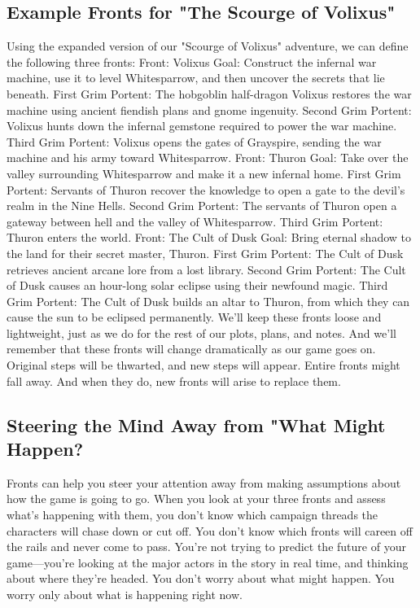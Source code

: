 \documentclass[10pt,a4paper,twoside,bg=print,twocolumn,openany,nodeprecatedcode]{dndbook}
\begin{document}
\subsection{Example Fronts for "The Scourge of Volixus"}
Using the expanded version of our "Scourge of Volixus" adventure, we can define the following three fronts:
Front: Volixus
Goal: Construct the infernal war machine, use it to level Whitesparrow, and then uncover the secrets that lie beneath.
First Grim Portent: The hobgoblin half-dragon Volixus restores the war machine using ancient fiendish plans and gnome ingenuity.
Second Grim Portent: Volixus hunts down the infernal gemstone required to power the war machine.
Third Grim Portent: Volixus opens the gates of Grayspire, sending the war machine and his army toward Whitesparrow.
Front: Thuron
Goal: Take over the valley surrounding Whitesparrow and make it a new infernal home.
First Grim Portent: Servants of Thuron recover the knowledge to open a gate to the devil's realm in the Nine Hells.
Second Grim Portent: The servants of Thuron open a gateway between hell and the valley of Whitesparrow.
Third Grim Portent: Thuron enters the world.
Front: The Cult of Dusk
Goal: Bring eternal shadow to the land for their secret master, Thuron.
First Grim Portent: The Cult of Dusk retrieves ancient arcane lore from a lost library.
Second Grim Portent: The Cult of Dusk causes an hour-long solar eclipse using their newfound magic.
Third Grim Portent: The Cult of Dusk builds an altar to Thuron, from which they can cause the sun to be eclipsed permanently.
We'll keep these fronts loose and lightweight, just as we do for the rest of our plots, plans, and notes. And we'll remember that these fronts will change dramatically as our game goes on. Original steps will be thwarted, and new steps will appear. Entire fronts might fall away. And when they do, new fronts will arise to replace them.
\subsection{Steering the Mind Away from "What Might Happen?}
Fronts can help you steer your attention away from making assumptions about how the game is going to go. When you look at your three fronts and assess what's happening with them, you don't know which campaign threads the characters will chase down or cut off. You don't know which fronts will careen off the rails and never come to pass. You're not trying to predict the future of your game—you're looking at the major actors in the story in real time, and thinking about where they're headed. You don't worry about what might happen. You worry only about what is happening right now.
\end{document}
